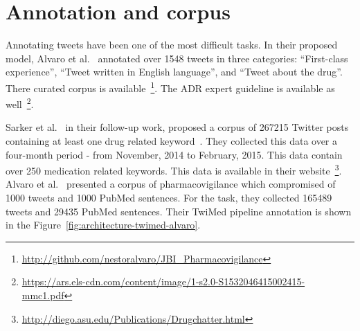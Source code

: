 \section{Annotation and corpus}

Annotating tweets have been one of the most difficult tasks. In their proposed model, Alvaro et al.~\cite{alvaro2015crowdsourcing} annotated over 1548 tweets in three categories: “First-class experience”, “Tweet written in English language”, and “Tweet about the drug”. There curated corpus is available~\footnote{\url{http://github.com/nestoralvaro/JBI_Pharmacovigilance}}. The ADR expert guideline is available as well~\footnote{\url{https://ars.els-cdn.com/content/image/1-s2.0-S1532046415002415-mmc1.pdf}}.

Sarker et al.~\cite{sarker2016social} in their follow-up work, proposed a corpus  of  267215  Twitter  posts  containing  at least one drug related keyword~\cite{sarker2017corpus}. They collected this data  over a four-month  period - from  November, 2014  to  February, 2015. This data contain over 250 medication related keywords. This data is available in their website~\footnote{\url{http://diego.asu.edu/Publications/Drugchatter.html}}. Alvaro et al.~\cite{alvaro2017twimed} presented a corpus of pharmacovigilance which compromised of 1000 tweets and 1000 PubMed sentences. For the task, they collected 165489 tweets and 29435 PubMed sentences. Their TwiMed pipeline annotation is shown in the Figure~\ref{fig:architecture-twimed-alvaro}.


